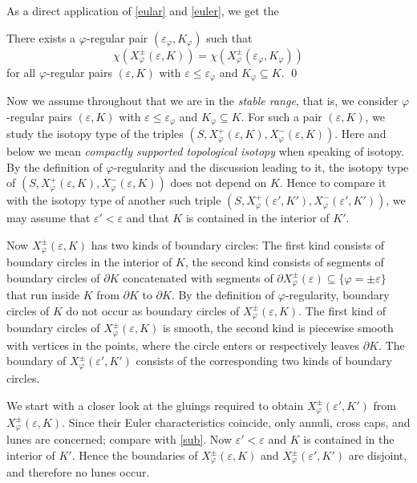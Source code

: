 As a direct application of \eqref{eular} and \cref{euler}, we get the

\begin{cor}\label{eulim}
There exists a ${\varphi}$-regular pair $({\varepsilon}_{\varphi},K_{\varphi})$ such that
\begin{equation*}
  \chi(X_{\varphi}^\pm({\varepsilon},K))=\chi(X_{\varphi}^\pm({\varepsilon}_{\varphi},K_{\varphi}))
\end{equation*}
for all ${\varphi}$-regular pairs $({\varepsilon},K)$ with ${\varepsilon}\le{\varepsilon}_{\varphi}$ and $K_{\varphi}\subseteq K$. \qed
\end{cor}

Now we assume throughout that we are in the \emph{stable range},
that is, we consider ${\varphi}$-regular pairs $({\varepsilon},K)$ with ${\varepsilon}\le{\varepsilon}_{\varphi}$
and $K_{\varphi}\subseteq K$.
For such a pair $({\varepsilon},K)$,
we study the isotopy type of the triples $(S,X_{\varphi}^+({\varepsilon},K),X_{\varphi}^-({\varepsilon},K))$.
Here and below we mean \emph{compactly supported topological isotopy}
when speaking of isotopy.
By the definition of ${\varphi}$-regularity and the discussion leading to it,
the isotopy type of $(S,X_{\varphi}^+({\varepsilon},K),X_{\varphi}^-({\varepsilon},K))$ does not depend on $K$.
Hence to compare it with the isotopy type of another such triple
$(S,X_{\varphi}^+({\varepsilon}',K'),X_{\varphi}^-({\varepsilon}',K'))$,
we may assume that ${\varepsilon}'<{\varepsilon}$ and that $K$ is contained in the interior of $K'$.

Now $X_{\varphi}^\pm({\varepsilon},K)$ has two kinds of boundary circles:
The first kind consists of boundary circles in the interior of $K$,
the second kind consists of segments of boundary circles of $\partial K$
concatenated with segments of $\partial X_{\varphi}^\pm({\varepsilon})\subseteq\{{\varphi}=\pm{\varepsilon}\}$
that run inside $K$ from $\partial K$ to $\partial K$.
By the definition of ${\varphi}$-regularity,
boundary circles of $K$ do not occur as boundary circles of  $X_{\varphi}^\pm({\varepsilon},K)$.
The first kind of boundary circles of  $X_{\varphi}^\pm({\varepsilon},K)$ is smooth,
the second kind is piecewise smooth with vertices in the points,
where the circle enters or respectively leaves $\partial K$.
The boundary of $X_{\varphi}^\pm({\varepsilon}',K')$ consists of the corresponding two kinds
of boundary circles.

We start with a closer look at the gluings required
to obtain $X_{\varphi}^\pm({\varepsilon}',K')$ from $X_{\varphi}^\pm({\varepsilon},K)$.
Since their Euler characteristics coincide,
only annuli, cross caps, and lunes are concerned; compare with \cref{sub}.
Now ${\varepsilon}'<{\varepsilon}$ and $K$ is contained in the interior of $K'$.
Hence the boundaries of $X_{\varphi}^\pm({\varepsilon},K)$ and $X_{\varphi}^\pm({\varepsilon}',K')$
are disjoint, and therefore no lunes occur.


